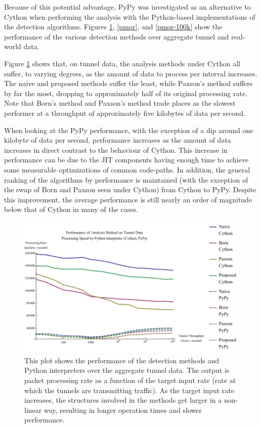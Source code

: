 \documentclass[12pt]{report}
\theoremstyle{remark}
\theoremstyle{definition}
\theoremstyle{definition}
\theoremstyle{definition}
\begin{document}
Because of this potential advantage, PyPy was investigated as an alternative to
Cython when performing the analysis with the Python-based implementations of the
detection algorithms. Figures \ref{pmat}, \ref{pmqr}, and \ref{pmqr-100k} show
the performance of the various detection methods over aggregate tunnel and
real-world data.

Figure \ref{pmat} shows that, on tunnel data, the analysis methods under Cython
all suffer, to varying degrees, as the amount of data to process per interval
increases. The naive and proposed methods suffer the least, while Paxson's
method suffers by far the most, dropping to approximately half of its original
processing rate. Note that Born's method and Paxson's method trade places as the
slowest performer at a throughput of approximately five kilobytes of data per
second.

When looking at the PyPy performance, with the exception of a dip around one
kilobyte of data per second, performance increases as the amount of data
increases in direct contrast to the behaviour of Cython. This increase in
performance can be due to the JIT components having enough time to achieve some
measurable optimizations of common code-paths. In addition, the general ranking
of the algorithms by performance is maintained (with the exception of the swap
of Born and Paxson seen under Cython) from Cython to PyPy. Despite this
improvement, the average performance is still nearly an order of magnitude below
that of Cython in many of the cases.

\begin{figure}
\centering
\includegraphics[width=\textwidth]{figures/pmat.pdf}
\caption[Performance of Analysis Method and Python Interpreter on Aggregate
Tunnel Data]{This plot shows the performance of the detection methods and Python
interpreters over the aggregate tunnel data. The output is packet processing
rate as a function of the target input rate (rate at which the tunnels are
transmitting traffic). As the target input rate increases, the structures
involved in the methods get larger in a non-linear way, resulting in longer
operation times and slower performance.}
\label{pmat}
\end{figure}
\end{document}
